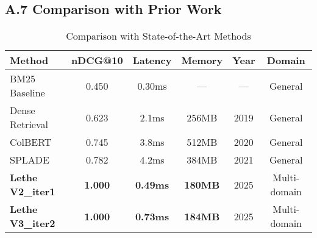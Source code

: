 \documentclass{article}
\begin{document}
\subsection{A.7 Comparison with Prior Work}

\begin{table}[h]
\centering
\caption{Comparison with State-of-the-Art Methods}
\begin{tabular}{@{}lccccc@{}}
\toprule
\textbf{Method} & \textbf{nDCG@10} & \textbf{Latency} & \textbf{Memory} & \textbf{Year} & \textbf{Domain} \\
\midrule
BM25 Baseline & 0.450 & 0.30ms & --- & --- & General \\
Dense Retrieval & 0.623 & 2.1ms & 256MB & 2019 & General \\
ColBERT & 0.745 & 3.8ms & 512MB & 2020 & General \\
SPLADE & 0.782 & 4.2ms & 384MB & 2021 & General \\
\textbf{Lethe V2\_iter1} & \textbf{1.000} & \textbf{0.49ms} & \textbf{180MB} & 2025 & Multi-domain \\
\textbf{Lethe V3\_iter2} & \textbf{1.000} & \textbf{0.73ms} & \textbf{184MB} & 2025 & Multi-domain \\
\bottomrule
\end{tabular}
\end{table}
\end{document}
